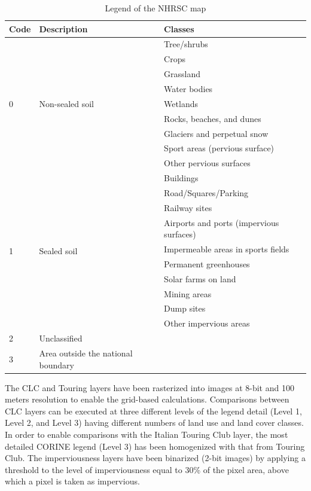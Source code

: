 \documentclass[APA,LATO1COL,doublespace]{WileyNJD-v2}
\begin{document}
\begin{table}
\caption{Legend of the NHRSC map}\label{tab:IMPclasses}
\centering
\begin{tabular}[t]{ l l | l } 
\hline
\textbf{Code} & \textbf{Description} & \textbf{Classes} \\
\hline
\multirow{9}{4em}{0} & \multirow{9}{10em}{Non-sealed soil} & Tree/shrubs \\ 
 &  & Crops \\ 
 &  & Grassland \\ 
 &  & Water bodies \\ 
 &  & Wetlands \\ 
 &  & Rocks, beaches, and dunes \\ 
 &  & Glaciers and perpetual snow \\ 
 &  & Sport areas (pervious surface) \\ 
 &  & Other pervious surfaces \\ 
\hline
\multirow{10}{4em}{1} & \multirow{10}{10em}{Sealed soil} & Buildings \\ 
 &  & Road/Squares/Parking \\ 
 &  & Railway sites \\ 
 &  & Airports and ports (impervious surfaces) \\ 
 &  & Impermeable areas in sports fields \\ 
 &  & Permanent greenhouses \\ 
 &  & Solar farms on land \\ 
 &  & Mining areas \\ 
 &  & Dump sites \\ 
 &  & Other impervious areas \\
\hline
2 & Unclassified & \\
\hline
3 & Area outside the national boundary & \\
\hline
\end{tabular}
\end{table}

The CLC and Touring layers have been rasterized into images at 8-bit and 100 meters resolution to enable the grid-based calculations. %
Comparisons between CLC layers can be executed at three different levels of the legend detail (Level 1, Level 2, and Level 3) having different numbers of land use and land cover classes. 
In order to enable comparisons with the Italian Touring Club layer, the most detailed CORINE legend (Level 3) has been homogenized with that from Touring Club. 
The imperviousness layers have been binarized (2-bit images) by applying a threshold to the level of imperviousness equal to 30\% of the pixel area, above which a pixel is taken as impervious.
\end{document}
